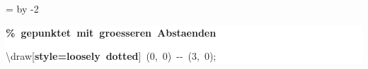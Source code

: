 \begingroup
\ttfamily
{}
=\textwidth
\advance{} by -2\fboxsep
\noindent
\colorbox{background}
{%
\parbox{\dimen255}
{%
\rule[-0.5ex]{0pt}{2.5ex}\hspace*{0.0em}\textcolor{G}{\textbf{\%~gepunktet~mit~groesseren~Abstaenden}}\\
\rule[-0.5ex]{0pt}{2.5ex}\hspace*{0.0em}\textbackslash{}draw[\textcolor{R}{\textbf{style=loosely~dotted}}]~(0,~0)~{-}{-}~(3,~0);}%
}%
\endgroup
